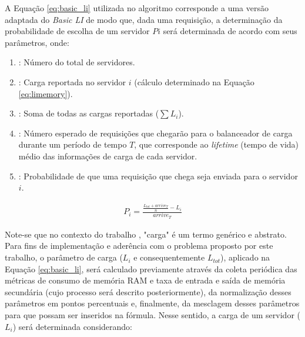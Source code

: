 A Equação \mbox{\ref{eq:basic_li}} utilizada no algoritmo corresponde a uma versão adaptada do \textit{Basic LI} \cite{interpretingStaleLoadInformation2000} de modo que, dada uma requisição, a determinação da probabilidade de escolha de um servidor $P{i}$ será determinada de acordo com seus parâmetros, onde:

\begin{enumerate}
    \item[$n$]: Número do total de servidores.
    \item[$L_{i}$]: Carga reportada no servidor $i$ (cálculo determinado na Equação \ref{eq:limemory}). 
    \item[$L_{tot}$]: Soma de todas as cargas reportadas ($\sum L_i$). 
    \item[$arrive_T$]: Número esperado de requisições que chegarão para o balanceador de carga durante um período de tempo $T$, que corresponde ao \textit{lifetime} (tempo de vida) médio das informações de carga de cada servidor.
    \item[$P_i$]: Probabilidade de que uma requisição que chega seja enviada para o servidor $i$. 
\end{enumerate}

\begin{gather} \label{eq:basic_li}
P_{i}=\frac{\frac{L_{tot}+arrive_{T}}{n}-L_{i}}{arrive_{T}}
\end{gather}

Note-se que no contexto do trabalho \cite{interpretingStaleLoadInformation2000}, "carga" é um termo genérico e abstrato. Para fins de implementação e aderência com o problema proposto por este trabalho, o parâmetro de carga ($L_i$ e consequentemente $L_{tot}$), aplicado na Equação \mbox{\ref{eq:basic_li}}, será calculado previamente através da coleta periódica das métricas de consumo de memória RAM e taxa de entrada e saída de memória secundária (cujo processo será descrito posteriormente), da normalização desses parâmetros em pontos percentuais e, finalmente, da mesclagem desses parâmetros para que possam ser inseridos na fórmula. Nesse sentido, a carga de um servidor ($L_i$) será determinada considerando:

